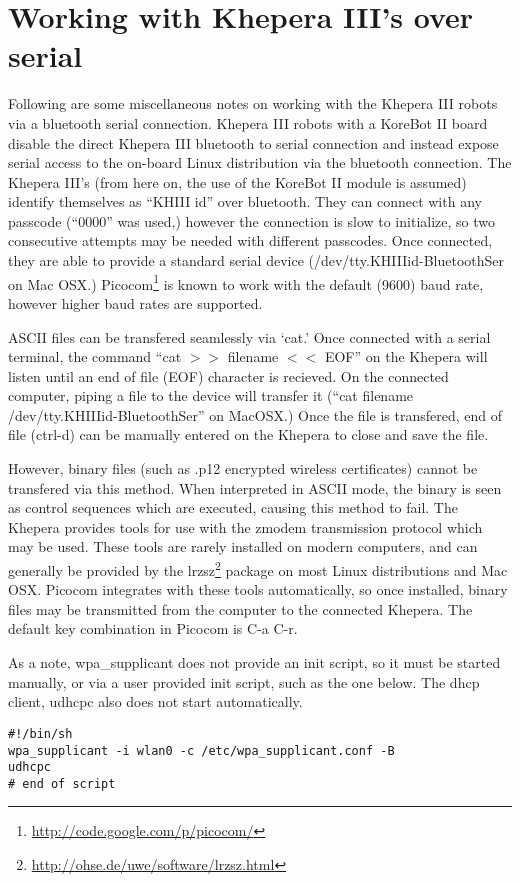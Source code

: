 \chapter{Working with Khepera III's over serial}
Following are some miscellaneous notes on working with the Khepera III robots via a bluetooth serial connection. Khepera III robots with a KoreBot II board disable the direct Khepera III bluetooth to serial connection and instead expose serial access to the on-board Linux distribution via the bluetooth connection. The Khepera III's (from here on, the use of the KoreBot II module is assumed) identify themselves as ``KHIII id'' over bluetooth. They can connect with any passcode (``0000'' was used,) however the connection is slow to initialize, so two consecutive attempts may be needed with different passcodes. Once connected, they are able to provide a standard serial device (/dev/tty.KHIIIid-BluetoothSer on Mac OSX.) Picocom\footnote{\url{http://code.google.com/p/picocom/}} is known to work with the default (9600) baud rate, however higher baud rates are supported.

ASCII files can be transfered seamlessly via `cat.' Once connected with a serial terminal, the command ``cat $>>$ filename $<<$ EOF'' on the Khepera will listen until an end of file (EOF) character is recieved. On the connected computer, piping a file to the device will transfer it (``cat filename /dev/tty.KHIIIid-BluetoothSer'' on MacOSX.) Once the file is transfered, end of file (ctrl-d) can be manually entered on the Khepera to close and save the file.

However, binary files (such as .p12 encrypted wireless certificates) cannot be transfered via this method. When interpreted in ASCII mode, the binary is seen as control sequences which are executed, causing this method to fail. The Khepera provides tools for use with the zmodem transmission protocol which may be used. These tools are rarely installed on modern computers, and can generally be provided by the lrzsz\footnote{\url{http://ohse.de/uwe/software/lrzsz.html}} package on most Linux distributions and Mac OSX. Picocom integrates with these tools automatically, so once installed, binary files may be transmitted from the computer to the connected Khepera. The default key combination in Picocom is C-a C-r.

As a note, wpa\_supplicant does not provide an init script, so it must be started manually, or via a user provided init script, such as the one below. The dhcp client, udhcpc also does not start automatically.
\begin{verbatim}
#!/bin/sh
wpa_supplicant -i wlan0 -c /etc/wpa_supplicant.conf -B
udhcpc
# end of script
\end{verbatim}

